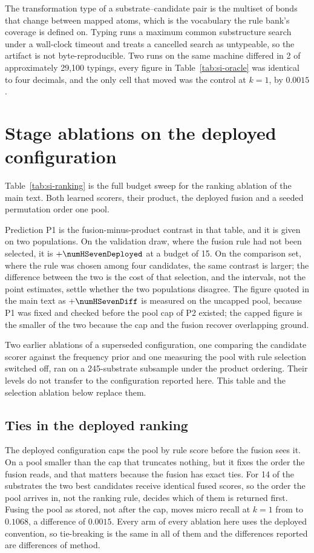 \documentclass[journal=jcisd8,manuscript=suppinfo,layout=onecolumn]{achemso}
\begin{document}
The transformation type of a substrate--candidate pair is the multiset of bonds that change
between mapped atoms, which is the vocabulary the rule bank's coverage is defined on. Typing runs
a maximum common substructure search under a wall-clock timeout and treats a cancelled search as
untypeable, so the artifact is not byte-reproducible. Two runs on the same machine differed in
2 of approximately 29,100 typings, every figure in Table~\ref{tab:si-oracle} was identical to four
decimals, and the only cell that moved was the control at $k=1$, by $0.0015$.

\section{Stage ablations on the deployed configuration}
\label{sec:si-ablations}



Table~\ref{tab:si-ranking} is the full budget sweep for the ranking ablation of the main text.
Both learned scorers, their product, the deployed fusion and a seeded permutation order one pool.

Prediction P1 is the fusion-minus-product contrast in that table, and it is given on two
populations. On the validation draw, where the fusion rule had not been selected, it is
$+\numHSevenDeployed$ at a budget of 15. On the comparison set, where the rule was chosen among
four candidates, the same contrast is larger; the difference between the two is the cost of that
selection, and the intervals, not the point estimates, settle whether the two
populations disagree. The figure quoted in the main text as $+\numHSevenDiff$ is measured on the
uncapped pool, because P1 was fixed and checked before the pool cap of P2 existed; the capped
figure is the smaller of the two because the cap and the fusion recover overlapping ground.

Two earlier ablations of a superseded configuration, one comparing the candidate scorer against the
frequency prior and one measuring the pool with rule selection switched off, ran on a
245-substrate subsample under the product ordering. Their levels do not transfer to the
configuration reported here. This table and the selection ablation below replace them.

\subsection{Ties in the deployed ranking}

The deployed configuration caps the pool by rule score before the fusion sees it. On a pool
smaller than the cap that truncates nothing, but it fixes the order the fusion reads, and that
matters because the fusion has exact ties. For 14 of the \numPopulationN{} substrates the two
best candidates receive identical fused scores, so the order the pool arrives in, not the ranking
rule, decides which of them is returned first. Fusing the pool as stored, not after
the cap, moves micro recall at $k=1$ from \numSelLearnedOne{} to $0.1068$, a
difference of $0.0015$. Every arm of every ablation here uses the deployed convention, so
tie-breaking is the same in all of them and the differences reported are differences of method.
\end{document}
